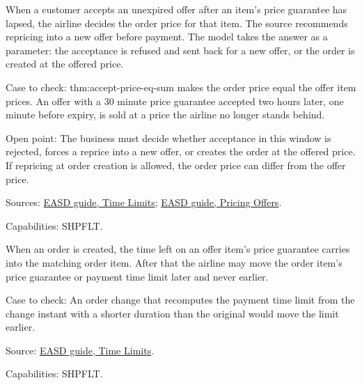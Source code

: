 \begin{definition}
  \label{def:offers-accept-after-guarantee-lapse}
  When a customer accepts an unexpired offer after an item's price guarantee
  has lapsed, the airline decides the order price for that item. The source
  recommends repricing into a new offer before payment. The model takes the
  answer as a parameter: the acceptance is refused and sent back for a new
  offer, or the order is created at the offered price.

  Case to check: thm:accept-price-eq-sum makes the order price equal the
  offer item prices. An offer with a 30 minute price guarantee accepted two
  hours later, one minute before expiry, is sold at a price the airline no
  longer stands behind.

  Open point: The business must decide whether acceptance in this window is
  rejected, forces a reprice into a new offer, or creates the order at the
  offered price. If repricing at order creation is allowed, the order price
  can differ from the offer price.

  Sources: \href{https://standards.atlassian.net/wiki/spaces/EASD/pages/574423066/Time+Limits}{EASD guide, Time Limits};
  \href{https://standards.atlassian.net/wiki/spaces/EASD/pages/574423098/Pricing+Offers}{EASD guide, Pricing Offers}.

  Capabilities: SHPFLT.
\end{definition}

\begin{theorem}
  \label{thm:offers-order-limits-only-extend}
  When an order is created, the time left on an offer item's price guarantee
  carries into the matching order item. After that the airline may move the
  order item's price guarantee or payment time limit later and never
  earlier.

  Case to check: An order change that recomputes the payment time limit from
  the change instant with a shorter duration than the original would move
  the limit earlier.

  Source: \href{https://standards.atlassian.net/wiki/spaces/EASD/pages/574423066/Time+Limits}{EASD guide, Time Limits}.

  Capabilities: SHPFLT.
\end{theorem}

